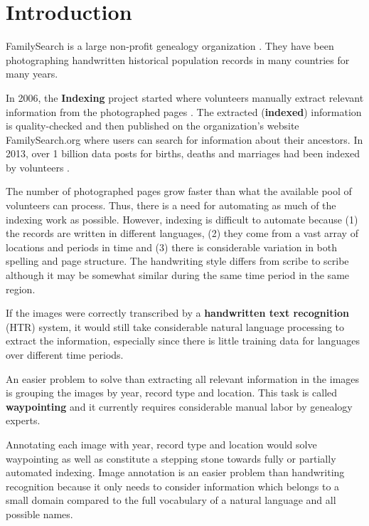 
\chapter{Introduction}

FamilySearch is a large non-profit genealogy organization \cite{FamilySearchAbout}. They have been photographing handwritten historical population records in many countries for many years.

In 2006, the \textbf{Indexing} project started where volunteers manually extract relevant information from the photographed pages \cite{Indexing}. The extracted (\textbf{indexed}) information is quality-checked and then published on the organization's website FamilySearch.org where users can search for information about their ancestors.
In 2013, over 1 billion data posts for births, deaths and marriages had been indexed by volunteers \cite{Billion}.

The number of photographed pages grow faster than what the available pool of volunteers can process. Thus, there is a need for automating as much of the indexing work as possible. However, indexing is difficult to automate because (1) the records are written in different languages, (2) they come from a vast array of locations and periods in time and (3) there is considerable variation in both spelling and page structure.
The handwriting style differs from scribe to scribe although it may be somewhat similar during the same time period in the same region.

If the images were correctly transcribed by a \textbf{handwritten text recognition} (HTR) system, it would still take considerable natural language processing to extract the information, especially since there is little training data for languages over different time periods.

An easier problem to solve than extracting all relevant information in the images is grouping the images by year, record type and location. This task is called \textbf{waypointing} \cite{Waypointing} and it currently requires considerable manual labor by genealogy experts.

Annotating each image with year, record type and location would solve waypointing as well as constitute a stepping stone towards fully or partially automated indexing.
Image annotation is an easier problem than handwriting recognition because it only needs to consider information which belongs to a small domain compared to the full vocabulary of a natural language and all possible names.





\newpage

